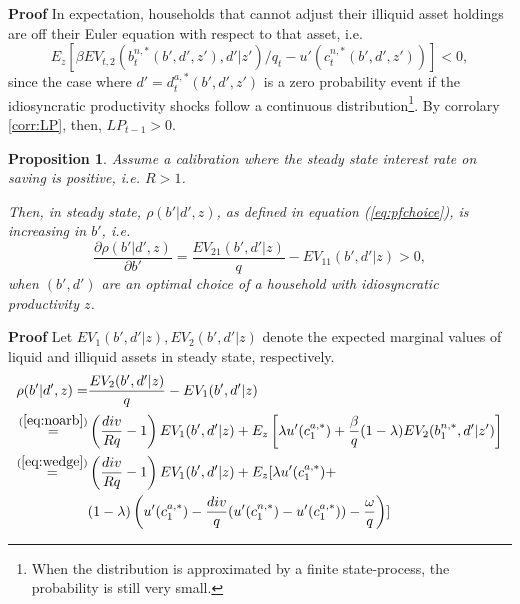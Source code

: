 \documentclass[11pt]{article} %
\newtheorem{prop}{Proposition}
\begin{document}
\textbf{Proof} In expectation, households that cannot adjust their illiquid asset holdings are off their Euler equation with respect to that asset, i.e.
\begin{equation}
E_z \left[ \beta EV_{t,2}(b_t^{n,*}(b',d',z'),d'|z')/q_t - u'(c^{n,*}_t(b',d',z')) \right] <0,
\end{equation}
since the case where $d' = d_t^{a,*}(b',d',z')$ is a zero probability event if the idiosyncratic productivity shocks follow a continuous distribution\footnote{When the distribution is approximated by a finite state-process, the probability is still very small.}. By corrolary \ref{corr:LP}, then, $LP_{t-1}>0$.


\begin{prop}\label{prop:rho}
Assume a calibration where the steady state interest rate on saving is positive, i.e. $R>1$.

Then, in steady state, $\rho(b'|d',z)$, as defined in equation (\ref{eq:pfchoice}), is increasing in $b'$, i.e.
\begin{equation}
\frac{\partial \rho(b'|d',z)}{\partial b'} = \frac{EV_{21}(b',d'|z)}{q} - EV_{11}(b',d'|z) > 0,
\end{equation}
when $(b',d')$ are an optimal choice of a household with idiosyncratic productivity $z$.
\end{prop}
\textbf{Proof} Let $EV_1(b',d'|z),EV_2(b',d'|z)$ denote the expected marginal values of liquid and illiquid assets in steady state, respectively.
\begin{align}
\rho(b'|d',z) =& \frac{EV_2(b',d'|z)}{q}-EV_1(b',d'|z) \\ \overset{ (\ref{eq:noarb})}{=}& \left( \frac{div}{Rq} - 1 \right) EV_1(b',d'|z) + E_z\left[ \lambda u'(c_1^{a,*}) + \frac{\beta}{q} (1-\lambda) EV_2(b_1^{n,*},d'|z')\right]\\
\overset{(\ref{eq:wedge})}{=} &  \left( \frac{div}{Rq} - 1 \right) EV_1(b',d'|z) + E_z [ \lambda u'(c_1^{a,*}) +\nonumber \\ & (1-\lambda) \left(u'(c_1^{a,*}) - \frac{div}{q}( u'(c_1^{n,*})-u'(c_1^{a,*}))-\frac{\omega}{q}\right) ]\label{eq:rhostep1}
\end{align}
\end{document}
